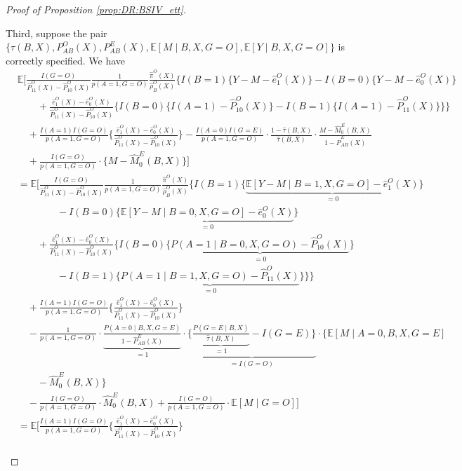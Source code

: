 \documentclass[10pt]{article}
\newcommand{\E}{\mathbb{E}}
\begin{document}
\begin{proof}[Proof of Proposition \ref{prop:DR:BSIV_ett}]
\begin{itemize}
Third, suppose the pair $\{\tau(B,X),P_{AB}^O(X),P_{AB}^E(X),\mathbb{E}[M\mid B,X,G=O],\mathbb{E}[Y\mid B,X,G=O]\}$ is correctly specified. We have
\begingroup
\allowdisplaybreaks
{\footnotesize \begin{align*}
&\E\Big[\frac{I(G=O)}{\hat{P}_{11}^O(X)-\hat{P}_{10}^O(X)}\frac{1}{p(A=1,G=O)}\frac{\hat{\pi}^O(X)}{\hat{\rho}_B^O(X)}\bigg\{I(B=1)\{Y-M-\hat{e}_1^O(X)\}-I(B=0)\{Y-M-\hat{e}_0^O(X)\}\\
&\quad\quad+\frac{\hat{e}_1^O(X)-\hat{e}_0^O(X)}{\hat{P}_{11}^O(X)-\hat{P}_{10}^O(X)}\big\{I(B=0)\{I(A=1)-\hat{P}_{10}^O(X)\}-I(B=1)\{I(A=1)-\hat{P}_{11}^O(X)\}\big\}\bigg\}\\
&\quad+\frac{I(A=1)I(G=O)}{p(A=1,G=O)}\Big\{\frac{\hat{e}_1^O(X)-\hat{e}_0^O(X)}{\hat{P}_{11}^O(X)-\hat{P}_{10}^O(X)}\Big\}-\frac{I(A=0)I(G=E)}{p(A=1,G=O)}\cdot\frac{1-\hat{\tau}(B,X)}{\hat{\tau}(B,X)}\cdot
\frac{M-\hat{M}_{0}^{E}(B,X)}{1-\hat{P}_{AB}^E(X)}\\
&\quad+\frac{I(G=O)}{p(A=1,G=O)}\cdot \{M-\hat{M}_{0}^{E}(B,X)\}\Big]\\
&=\E\Big[\frac{I(G=O)}{\hat{P}_{11}^O(X)-\hat{P}_{10}^O(X)}\frac{1}{p(A=1,G=O)}\frac{\hat{\pi}^O(X)}{\hat{\rho}_B^O(X)}\bigg\{I(B=1)\{\underbrace{\mathbb{E}[Y-M\mid B=1,X,G=O]-\hat{e}_1^O(X)}_{=0}\}\\
&\quad\quad\quad\quad-I(B=0)\{\underbrace{\mathbb{E}[Y-M\mid B=0,X,G=O]-\hat{e}_0^O(X)}_{=0}\}\\
&\quad\quad+\frac{\hat{e}_1^O(X)-\hat{e}_0^O(X)}{\hat{P}_{11}^O(X)-\hat{P}_{10}^O(X)}\big\{I(B=0)\{\underbrace{P(A=1\mid B=0,X,G=O)-\hat{P}_{10}^O(X)}_{=0}\}\\
&\quad\quad\quad\quad-I(B=1)\{\underbrace{P(A=1\mid B=1,X,G=O)-\hat{P}_{11}^O(X)}_{=0}\}\big\}\bigg\}\\
&\quad+\frac{I(A=1)I(G=O)}{p(A=1,G=O)}\Big\{\frac{\hat{e}_1^O(X)-\hat{e}_0^O(X)}{\hat{P}_{11}^O(X)-\hat{P}_{10}^O(X)}\Big\}\\
&\quad-\frac{1}{p(A=1,G=O)}\cdot\underbrace{\frac{P(A=0\mid B,X,G=E)}{1-\hat{P}_{AB}^E(X)}}_{=1}\cdot\underbrace{\Big\{\underbrace{\frac{P(G=E\mid B,X)}{\hat{\tau}(B,X)}}_{=1}-I(G=E)\Big\}}_{=I(G=O)}\cdot
\{\mathbb{E}[M\mid A=0,B,X,G=E]\\
&\quad\quad-\hat{M}_{0}^{E}(B,X)\}\\
&\quad-\frac{I(G=O)}{p(A=1,G=O)}\cdot \hat{M}_{0}^{E}(B,X)+\frac{I(G=O)}{p(A=1,G=O)}\cdot \mathbb{E}[M\mid G=O]\Big]\\
&=\E\Big[\frac{I(A=1)I(G=O)}{p(A=1,G=O)}\Big\{\frac{\hat{e}_1^O(X)-\hat{e}_0^O(X)}{\hat{P}_{11}^O(X)-\hat{P}_{10}^O(X)}\Big\}\\

\end{align*}}
\end{itemize}
\end{proof}
\end{document}
